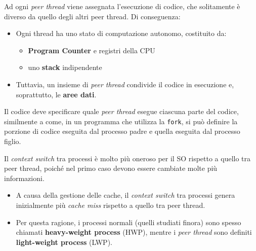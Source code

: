 Ad ogni \textit{peer thread} viene assegnata l’esecuzione di codice, che solitamente è diverso da quello degli altri peer thread. Di conseguenza:

\begin{itemize}
    \item Ogni thread ha uno stato di computazione autonomo, costituito da:
        \begin{itemize}
            \item \textbf{Program Counter} e registri della CPU
            \item uno \textbf{stack} indipendente
        \end{itemize}
    \item Tuttavia, un insieme di \textit{peer thread} condivide il codice in esecuzione e, soprattutto, le \textbf{aree dati}.
\end{itemize}

Il codice deve specificare quale \textit{peer thread} esegue ciascuna parte del codice, similmente a come, in un programma che utilizza la \texttt{fork}, si può definire la porzione di codice eseguita dal processo padre e quella eseguita dal processo figlio.


Il \textit{context switch} tra processi è molto più oneroso per il SO rispetto a quello tra peer thread, poiché nel primo caso devono essere cambiate molte più informazioni.

\begin{itemize}
    \item A causa della gestione delle cache, il \textit{context switch} tra processi genera inizialmente più \textit{cache miss} rispetto a quello tra peer thread.
    \item Per questa ragione, i processi normali (quelli studiati finora) sono spesso chiamati \textbf{heavy-weight process} (HWP), mentre i \textit{peer thread} sono definiti \textbf{light-weight process} (LWP).
\end{itemize}

